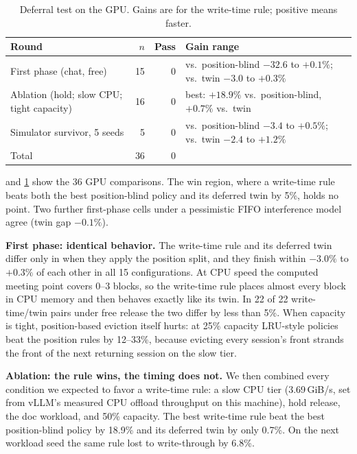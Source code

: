 \documentclass[conference]{IEEEtran}
\begin{document}
\begin{table}[t]
\centering
\caption{Deferral test on the GPU. Gains are for the write-time rule; positive means faster.}
\label{tab:scoreboard}
\footnotesize
\begin{tabular}{@{}p{2.5cm} r r p{3.15cm}@{}}
\toprule
Round & $n$ & Pass & Gain range \\
\midrule
First phase (chat, free) & 15 & 0 & vs.\ position-blind $-32.6$ to $+0.1\%$; vs.\ twin $-3.0$ to $+0.3\%$ \\
Ablation (hold; slow CPU; tight capacity) & 16 & 0 & best: $+18.9\%$ vs.\ position-blind, $+0.7\%$ vs.\ twin \\
Simulator survivor, 5 seeds & 5 & 0 & vs.\ position-blind $-3.4$ to $+0.5\%$; vs.\ twin $-2.4$ to $+1.2\%$ \\
\midrule
Total & 36 & 0 & \\
\bottomrule
\end{tabular}
\end{table}

 and \cref{tab:scoreboard} show the 36 GPU comparisons.
The win region, where a write-time rule beats both the best position-blind policy and its deferred twin by 5\%, holds no point.
Two further first-phase cells under a pessimistic FIFO interference model agree (twin gap $-0.1\%$).

\textbf{First phase: identical behavior.}
The write-time rule and its deferred twin differ only in when they apply the position split, and they finish within $-3.0\%$ to $+0.3\%$ of each other in all 15 configurations.
At CPU speed the computed meeting point covers 0--3 blocks, so the write-time rule places almost every block in CPU memory and then behaves exactly like its twin.
In 22 of 22 write-time/twin pairs under free release the two differ by less than 5\%.
When capacity is tight, position-based eviction itself hurts: at 25\% capacity LRU-style policies beat the position rules by 12--33\%, because evicting every session's front strands the front of the next returning session on the slow tier.

\textbf{Ablation: the rule wins, the timing does not.}
We then combined every condition we expected to favor a write-time rule: a slow CPU tier (3.69\,GiB/s, set from vLLM's measured CPU offload throughput on this machine), hold release, the doc workload, and 50\% capacity.
The best write-time rule beat the best position-blind policy by 18.9\% and its deferred twin by only 0.7\%.
On the next workload seed the same rule lost to write-through by 6.8\%.
\end{document}
